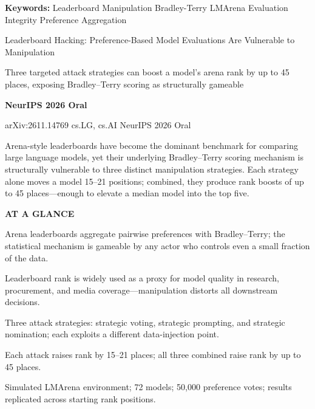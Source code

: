\documentclass[10pt,twocolumn]{article}
\begin{document}
\setlength{\parindent}{0pt}
\setlength{\parskip}{4pt}

{\small\color{keywordgray}\textbf{Keywords:}
  Leaderboard Manipulation \textbullet{} Bradley-Terry \textbullet{} LMArena \textbullet{} Evaluation Integrity \textbullet{} Preference Aggregation}\par\vspace{4pt}

{\LARGE\bfseries\raggedright Leaderboard Hacking: Preference-Based Model Evaluations Are Vulnerable to Manipulation}\par\vspace{4pt}
{\large\itshape\raggedright Three targeted attack strategies can boost a model's arena rank by up to 45 places, exposing Bradley--Terry scoring as structurally gameable}\par\vspace{6pt}
{\small\textbf{NeurIPS 2026 Oral}}\par\vspace{2pt}
{\small\color{keywordgray}arXiv:2611.14769 \textbullet{} cs.LG, cs.AI \textbullet{} NeurIPS 2026 Oral}
\par\vspace{2pt}\noindent{\color{rulered}\rule{\columnwidth}{0.6pt}}\vspace{6pt}

Arena-style leaderboards have become the dominant benchmark for comparing large language models, yet their underlying Bradley--Terry scoring mechanism is structurally vulnerable to three distinct manipulation strategies.
Each strategy alone moves a model 15--21 positions; combined, they produce rank boosts of up to 45 places---enough to elevate a median model into the top five.

\begin{mdframed}[backgroundcolor=boxgray,linecolor=rulered,linewidth=1pt,
    innerleftmargin=6pt,innerrightmargin=6pt,
    innertopmargin=6pt,innerbottommargin=6pt]
\textbf{\small AT A GLANCE}\par\vspace{4pt}
\begin{description}[leftmargin=0pt,labelsep=4pt,itemsep=2pt,parsep=0pt,
    font=\small\bfseries]
  \item[Problem:] Arena leaderboards aggregate pairwise preferences with Bradley--Terry; the statistical mechanism is gameable by any actor who controls even a small fraction of the data.
  \item[Why it matters:] Leaderboard rank is widely used as a proxy for model quality in research, procurement, and media coverage---manipulation distorts all downstream decisions.
  \item[Method:] Three attack strategies: strategic voting, strategic prompting, and strategic nomination; each exploits a different data-injection point.
  \item[Result:] Each attack raises rank by 15--21 places; all three combined raise rank by up to 45 places.
  \item[Evidence:] Simulated LMArena environment; 72 models; 50,000 preference votes; results replicated across starting rank positions.
\end{description}
\end{mdframed}
\end{document}
